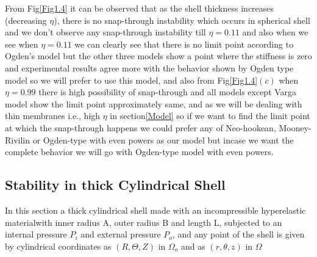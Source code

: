 \documentclass[12pt]{report}
\begin{document}
From Fig\ref{Fig1.4} it can be observed that as the shell thickness increases (decreasing $\eta$), there is no snap-through instability which occurs in spherical shell and we don't observe any snap-through instability till $\eta = 0.11$ and also when we see when $\eta = 0.11$ we can clearly see that there is no limit point according to Ogden's model but the other three models show a point where the stiffness is zero and experimental results agree more with the behavior shown by Ogden type model so we will prefer to use this model, and also from Fig\ref{Fig1.4}$(c)$ when $\eta=0.99$ there is high possibility of snap-through and all models except Varga model show the limit point approximately same, and as we will be dealing with thin membranes i.e., high $\eta$ in section\ref{Model} so if we want to find the limit point at which the snap-through happens we could prefer any of Neo-hookean, Mooney-Rivilin or Ogden-type with even powers as our model but incase we want the complete behavior we will go with Ogden-type model with even powers. 

\subsection{Stability in thick Cylindrical Shell}\label{cylinder}
In this section a thick cylindrical shell made with an incompressible hyperelastic materialwith inner radius A, outer radius B and length L, subjected to an internal pressure $P_{i}$ and external pressure $P_{o}$, and any point of the shell is given by cylindrical coordinates as $(R,\Theta,Z)$ in $\Omega_{o}$ and as $(r,\theta,z)$ in $\Omega$
\end{document}
